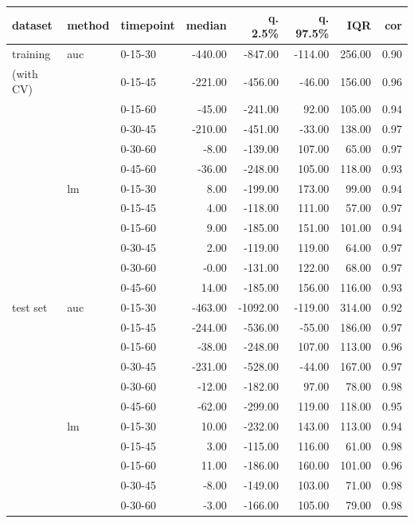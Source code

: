 \documentclass[12pt]{article}
\begin{document}
\begin{table}[ht]
\centering
\begin{tabular}{lllrrrrr}
  \hline
dataset & method & timepoint & median & q. 2.5\% & q. 97.5\% & IQR & cor \\ 
  \hline
training & auc & 0-15-30 & -440.00 & -847.00 & -114.00 & 256.00 & 0.90 \\ [1mm]
  (with CV) &  & 0-15-45 & -221.00 & -456.00 & -46.00 & 156.00 & 0.96 \\ 
   &  & 0-15-60 & -45.00 & -241.00 & 92.00 & 105.00 & 0.94 \\ 
   &  & 0-30-45 & -210.00 & -451.00 & -33.00 & 138.00 & 0.97 \\ 
   &  & 0-30-60 & -8.00 & -139.00 & 107.00 & 65.00 & 0.97 \\ 
   &  & 0-45-60 & -36.00 & -248.00 & 105.00 & 118.00 & 0.93 \\ 
   & lm & 0-15-30 & 8.00 & -199.00 & 173.00 & 99.00 & 0.94 \\ 
   &  & 0-15-45 & 4.00 & -118.00 & 111.00 & 57.00 & 0.97 \\ 
   &  & 0-15-60 & 9.00 & -185.00 & 151.00 & 101.00 & 0.94 \\ 
   &  & 0-30-45 & 2.00 & -119.00 & 119.00 & 64.00 & 0.97 \\ 
   &  & 0-30-60 & -0.00 & -131.00 & 122.00 & 68.00 & 0.97 \\ 
   &  & 0-45-60 & 14.00 & -185.00 & 156.00 & 116.00 & 0.93 \\ [3mm]
  test set & auc & 0-15-30 & -463.00 & -1092.00 & -119.00 & 314.00 & 0.92 \\ 
   &  & 0-15-45 & -244.00 & -536.00 & -55.00 & 186.00 & 0.97 \\ 
   &  & 0-15-60 & -38.00 & -248.00 & 107.00 & 113.00 & 0.96 \\ 
   &  & 0-30-45 & -231.00 & -528.00 & -44.00 & 167.00 & 0.97 \\ 
   &  & 0-30-60 & -12.00 & -182.00 & 97.00 & 78.00 & 0.98 \\ 
   &  & 0-45-60 & -62.00 & -299.00 & 119.00 & 118.00 & 0.95 \\ [1mm]
   & lm & 0-15-30 & 10.00 & -232.00 & 143.00 & 113.00 & 0.94 \\ 
   &  & 0-15-45 & 3.00 & -115.00 & 116.00 & 61.00 & 0.98 \\ 
   &  & 0-15-60 & 11.00 & -186.00 & 160.00 & 101.00 & 0.96 \\ 
   &  & 0-30-45 & -8.00 & -149.00 & 103.00 & 71.00 & 0.98 \\ 
   &  & 0-30-60 & -3.00 & -166.00 & 105.00 & 79.00 & 0.98 \\ 

\end{tabular}
\end{table}
\end{document}
